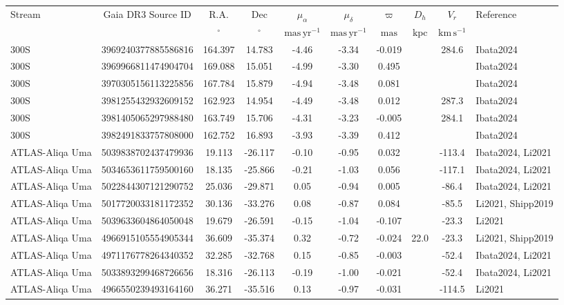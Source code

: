 \centering
\begin{tabular}{lcSSSSSSSl}
\hline\hline
Stream & Gaia DR3 Source ID & {R.A.} & {Dec} & $\mu_\alpha$ & $\mu_\delta$ & $\varpi$ & {$D_h$} & {$V_r$} & Reference \\
 &  & $\mathrm{{}^{\circ}}$ & $\mathrm{{}^{\circ}}$ & $\mathrm{mas\,yr^{-1}}$ & $\mathrm{mas\,yr^{-1}}$ & $\mathrm{mas}$ & $\mathrm{kpc}$ & $\mathrm{km\,s^{-1}}$ &  \\
\hline
300S & 3969240377885586816 & 164.397 & 14.783 & -4.46 & -3.34 & -0.019 &  & 284.6 & Ibata2024 \\
300S & 3969966811474904704 & 169.088 & 15.051 & -4.99 & -3.30 & 0.495 &  &  & Ibata2024 \\
300S & 3970305156113225856 & 167.784 & 15.879 & -4.94 & -3.48 & 0.081 &  &  & Ibata2024 \\
300S & 3981255432932609152 & 162.923 & 14.954 & -4.49 & -3.48 & 0.012 &  & 287.3 & Ibata2024 \\
300S & 3981405065297988480 & 163.749 & 15.706 & -4.31 & -3.23 & -0.005 &  & 284.1 & Ibata2024 \\
300S & 3982491833757808000 & 162.752 & 16.893 & -3.93 & -3.39 & 0.412 &  &  & Ibata2024 \\
ATLAS-Aliqa Uma & 5039838702437479936 & 19.113 & -26.117 & -0.10 & -0.95 & 0.032 &  & -113.4 & Ibata2024, Li2021 \\
ATLAS-Aliqa Uma & 5034653611759500160 & 18.135 & -25.866 & -0.21 & -1.03 & 0.056 &  & -117.1 & Ibata2024, Li2021 \\
ATLAS-Aliqa Uma & 5022844307121290752 & 25.036 & -29.871 & 0.05 & -0.94 & 0.005 &  & -86.4 & Ibata2024, Li2021 \\
ATLAS-Aliqa Uma & 5017720033181172352 & 30.136 & -33.276 & 0.08 & -0.87 & 0.084 &  & -85.5 & Li2021, Shipp2019 \\
ATLAS-Aliqa Uma & 5039633604864050048 & 19.679 & -26.591 & -0.15 & -1.04 & -0.107 &  & -23.3 & Li2021 \\
ATLAS-Aliqa Uma & 4966915105554905344 & 36.609 & -35.374 & 0.32 & -0.72 & -0.024 & 22.0 & -23.3 & Li2021, Shipp2019 \\
ATLAS-Aliqa Uma & 4971176778264340352 & 32.285 & -32.768 & 0.15 & -0.85 & -0.003 &  & -52.4 & Ibata2024, Li2021 \\
ATLAS-Aliqa Uma & 5033893299468726656 & 18.316 & -26.113 & -0.19 & -1.00 & -0.021 &  & -52.4 & Ibata2024, Li2021 \\
ATLAS-Aliqa Uma & 4966550239493164160 & 36.271 & -35.516 & 0.13 & -0.97 & -0.031 &  & -114.5 & Li2021 \\

\end{tabular}
